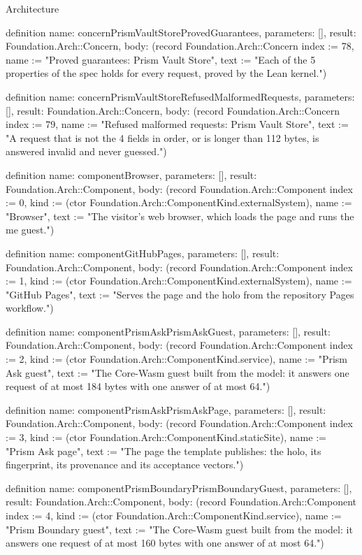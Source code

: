 \begin{lexlean}{Architecture}
\begin{semanticmodule}
definition{
  name: concernPrismVaultStoreProvedGuarantees,
  parameters: [],
  result: Foundation.Arch::Concern,
  body: (record Foundation.Arch::Concern {index := 78, name := "Proved guarantees: Prism Vault Store", text := "Each of the 5 properties of the spec holds for every request, proved by the Lean kernel."})
}

definition{
  name: concernPrismVaultStoreRefusedMalformedRequests,
  parameters: [],
  result: Foundation.Arch::Concern,
  body: (record Foundation.Arch::Concern {index := 79, name := "Refused malformed requests: Prism Vault Store", text := "A request that is not the 4 fields in order, or is longer than 112 bytes, is answered invalid and never guessed."})
}

definition{
  name: componentBrowser,
  parameters: [],
  result: Foundation.Arch::Component,
  body: (record Foundation.Arch::Component {index := 0, kind := (ctor Foundation.Arch::ComponentKind.externalSystem), name := "Browser", text := "The visitor's web browser, which loads the page and runs the me guest."})
}

definition{
  name: componentGitHubPages,
  parameters: [],
  result: Foundation.Arch::Component,
  body: (record Foundation.Arch::Component {index := 1, kind := (ctor Foundation.Arch::ComponentKind.externalSystem), name := "GitHub Pages", text := "Serves the page and the holo from the repository Pages workflow."})
}

definition{
  name: componentPrismAskPrismAskGuest,
  parameters: [],
  result: Foundation.Arch::Component,
  body: (record Foundation.Arch::Component {index := 2, kind := (ctor Foundation.Arch::ComponentKind.service), name := "Prism Ask guest", text := "The Core-Wasm guest built from the model: it answers one request of at most 184 bytes with one answer of at most 64."})
}

definition{
  name: componentPrismAskPrismAskPage,
  parameters: [],
  result: Foundation.Arch::Component,
  body: (record Foundation.Arch::Component {index := 3, kind := (ctor Foundation.Arch::ComponentKind.staticSite), name := "Prism Ask page", text := "The page the template publishes: the holo, its fingerprint, its provenance and its acceptance vectors."})
}

definition{
  name: componentPrismBoundaryPrismBoundaryGuest,
  parameters: [],
  result: Foundation.Arch::Component,
  body: (record Foundation.Arch::Component {index := 4, kind := (ctor Foundation.Arch::ComponentKind.service), name := "Prism Boundary guest", text := "The Core-Wasm guest built from the model: it answers one request of at most 160 bytes with one answer of at most 64."})
}


\end{semanticmodule}
\end{lexlean}
